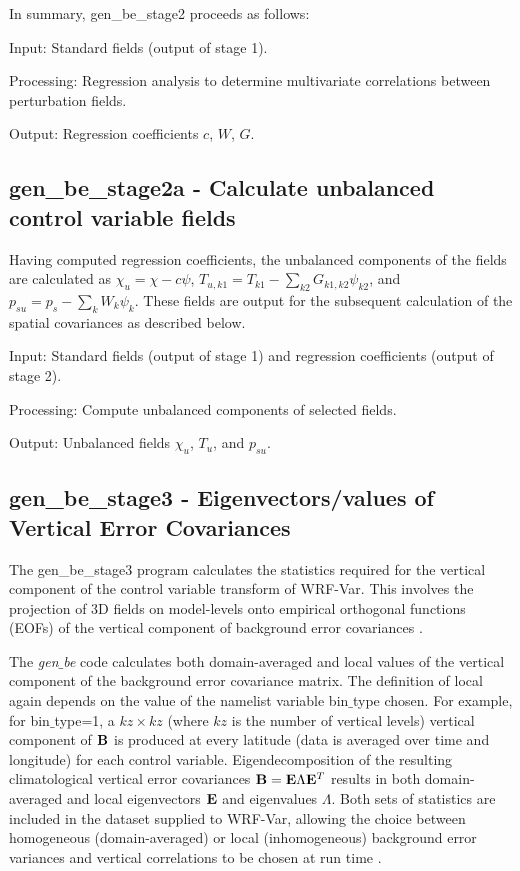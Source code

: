 In summary, gen\_be\_stage2 proceeds as follows:

Input: Standard fields (output of stage 1).

Processing: Regression analysis to determine multivariate correlations between perturbation fields.

Output: Regression coefficients $c$, $W$, $G$.


\subsection{gen\_be\_stage2a - Calculate unbalanced control variable fields}

Having computed regression coefficients, the unbalanced components of the fields are 
calculated as $\chi_u=\chi-c\psi$, $T_{u,k1}=T_{k1}-\sum_{k2}G_{k1,k2}\psi_{k2}$, 
and $p_{su}=p_s - \sum_{k} W_{k}\psi_{k}$. These fields are output for the 
subsequent calculation of the spatial covariances as described below.

Input: Standard fields (output of stage 1) and regression coefficients (output of stage 2).

Processing: Compute unbalanced components of selected fields.

Output: Unbalanced fields $\chi_u$,  $T_u$, and $p_{su}$.


\subsection{gen\_be\_stage3 - Eigenvectors/values of Vertical Error Covariances}

The gen\_be\_stage3 program calculates the statistics required for the vertical component of the control variable transform of WRF-Var. This involves the projection of 3D fields on model-levels onto empirical orthogonal functions (EOFs) of the vertical component of background error covariances \citep{barker04}.


The {\it gen$\_$be} code calculates both domain-averaged and local
values of the vertical component of the background error covariance
matrix. The definition of local again depends on the value of the
namelist variable bin$\_$type chosen. For example, for bin$\_$type=1,
a $kz \times kz$ (where $kz$ is the number of vertical levels) vertical
component of $\bf B$ is produced at every latitude (data is averaged
over time and longitude) for each control variable. Eigendecomposition
of the resulting climatological vertical error covariances ${\bf
B}={\bf E}{\Lambda}{\bf E}^{T}$ results in both domain-averaged and
local eigenvectors $\bf E$ and eigenvalues $\Lambda$. Both sets of
statistics are included in the dataset supplied to WRF-Var, allowing
the choice between homogeneous (domain-averaged) or local
(inhomogeneous) background error variances and vertical correlations
to be chosen at run time \citep{barker04}.

